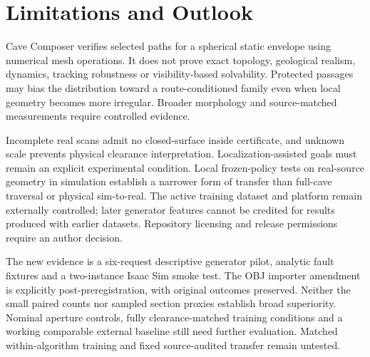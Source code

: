 \section{Limitations and Outlook}
Cave Composer verifies selected paths for a spherical static envelope using
numerical mesh operations. It does not prove exact topology, geological
realism, dynamics, tracking robustness or visibility-based solvability.
Protected passages may bias the distribution toward a route-conditioned
family even when local geometry becomes more irregular. Broader morphology
and source-matched measurements require controlled evidence.

Incomplete real scans admit no closed-surface inside certificate, and unknown
scale prevents physical clearance interpretation. Localization-assisted goals
must remain an explicit experimental condition. Local frozen-policy tests on
real-source geometry in simulation establish a narrower form of transfer than
full-cave traversal or physical sim-to-real. The active training dataset and
platform remain externally controlled; later generator features cannot be
credited for results produced with earlier datasets. Repository licensing
and release permissions require an author decision.

The new evidence is a six-request descriptive generator pilot, analytic fault
fixtures and a two-instance Isaac Sim smoke test. The OBJ importer amendment
is explicitly post-preregistration, with original outcomes preserved. Neither
the small paired counts nor sampled section proxies establish broad superiority.
Nominal aperture controls, fully clearance-matched training conditions and a
working comparable external baseline still need further evaluation. Matched
within-algorithm training and fixed source-audited transfer remain untested.
